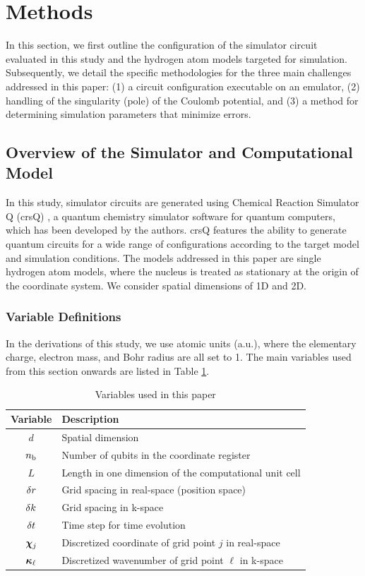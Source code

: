 \documentclass[jctc-draft.tex]{subfiles}
\begin{document}
\section{Methods}
\label{sec:method}
In this section, we first outline the configuration of the simulator circuit
evaluated in this study and the hydrogen atom models targeted for simulation.
Subsequently, we detail the specific methodologies for the three main challenges
addressed in this paper: (1) a circuit configuration executable on an emulator,
(2) handling of the singularity (pole) of the Coulomb potential, and (3) a
method for determining simulation parameters that minimize errors.

\subsection{Overview of the Simulator and Computational Model}
\label{subsec:simulator-model}
In this study, simulator circuits are generated using Chemical Reaction
Simulator Q (crsQ) \cite{website:crsq}, a quantum chemistry simulator software
for quantum computers, which has been developed by the authors. crsQ features
the ability to generate quantum circuits for a wide range of configurations
according to the target model and simulation conditions. The models addressed in
this paper are single hydrogen atom models, where the nucleus is treated as
stationary at the origin of the coordinate system. We consider spatial
dimensions of 1D and 2D.

\subsubsection{Variable Definitions}
In the derivations of this study, we use atomic units (a.u.), where the
elementary charge, electron mass, and Bohr radius are all set to 1. The main
variables used from this section onwards are listed in Table
\ref{tab:variables}.

\begin{table}
    \centering
    \caption{Variables used in this paper}
    \begin{tabular}{cl}
        Variable & Description \\
        \hline
        $d$ & Spatial dimension \\
        $n_{\mathrm{b}}$ & Number of qubits in the coordinate register \\
        $L$ & Length in one dimension of the computational unit cell \\
        $\delta r$ & Grid spacing in real-space (position space) \\
        $\delta k$ & Grid spacing in k-space \\
        $\delta t$ & Time step for time evolution \\
        $\bm{\chi}_{j}$ & Discretized coordinate of grid point $j$ in real-space\\
        $\bm{\kappa}_{\ell}$ & Discretized wavenumber of grid point $\ell$ in k-space
    \end{tabular}
    \label{tab:variables}
\end{table}
\end{document}
